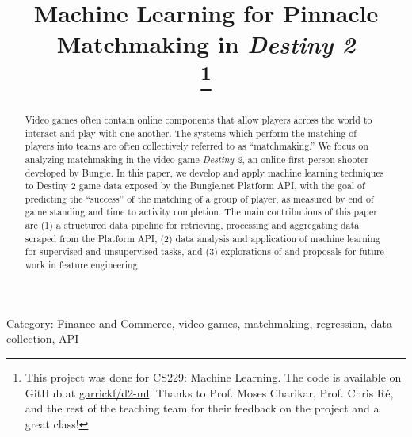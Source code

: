 \documentclass[conference]{IEEEtran}
\begin{document}
\title{Machine Learning for Pinnacle Matchmaking in \textit{Destiny 2}\\
    \thanks{This project was done for CS229: Machine Learning.
        The code is available on GitHub at
        \href{https://github.com/garrickf/d2-ml}{garrickf/d2-ml}.
        Thanks to Prof. Moses Charikar, Prof. Chris Ré, and the rest of the teaching team for their
        feedback on the project and a great class!}
}

\author{
}

\maketitle

\begin{abstract}
    Video games often contain online components that allow players across the world
    to interact and play with one another. The systems which perform the matching
    of players into teams are often collectively referred to as ``matchmaking.'' We
    focus on analyzing matchmaking in the video game \textit{Destiny 2}, an
    online first-person shooter developed by Bungie. In this paper, we develop and
    apply machine learning techniques to Destiny 2 game data exposed by the
    Bungie.net Platform API, with the goal of predicting the ``success'' of the
    matching of a group of player, as measured by end of game standing and time to
    activity completion. The main contributions of this paper are (1) a structured
    data pipeline for retrieving, processing and aggregating data scraped from the
    Platform API, (2) data analysis and application of machine learning for
    supervised and unsupervised tasks, and (3) explorations of and proposals for
    future work in feature engineering.
\end{abstract}

\begin{IEEEkeywords}
    Category: Finance and Commerce, video games, matchmaking, regression, data
    collection, API
\end{IEEEkeywords}
\end{document}
